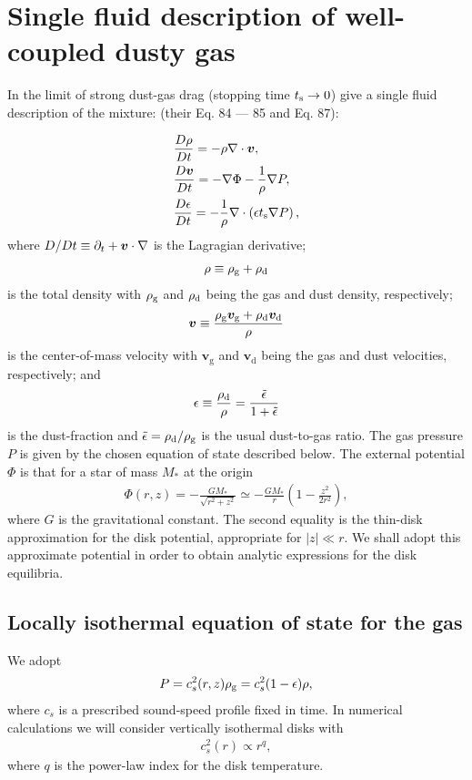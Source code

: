 \section{Single fluid description of well-coupled dusty gas}\label{setup} 
In the limit of strong dust-gas drag (stopping time $t_\mathrm{s}\to 0$) 
\cite{laibe14} give a single fluid description of the mixture:  
(their Eq. 84 --- 85 and Eq. 87): 

\begin{align}
  &\frac{D\rho}{Dt} = -\rho\nabla\cdot\bm{v}, \label{masseq}\\ 
  &\frac{D\bm{v}}{Dt} = - \nabla\Phi - \frac{1}{\rho}\nabla
  P, \label{momeq}\\ 
  &\frac{D\epsilon}{Dt} = -\frac{1}{\rho} \nabla \cdot \left(\epsilon 
  t_\mathrm{s} \nabla P \right),\label{dusteq}  
\end{align}
where $D/Dt \equiv \partial_t + \bm{v}\cdot\nabla$ is the Lagragian
derivative; 
\begin{align}
  \rho \equiv \rho_\mathrm{g} + \rho_\mathrm{d}
\end{align}
is the total density with $\rho_\mathrm{g}$ and $\rho_\mathrm{d}$ being the gas and dust
density, respectively; 
\begin{align}
  \bm{v} \equiv \frac{\rho_\mathrm{g}\bm{v}_\mathrm{g} + 
    \rho_\mathrm{d}\bm{v}_\mathrm{d}}{\rho}
\end{align}
is the center-of-mass velocity with $\bm{v}_\mathrm{g}$ and
$\bm{v}_\mathrm{d}$ being the gas and dust velocities, respectively; 
and 
\begin{align}
  \epsilon \equiv \frac{\rho_\mathrm{d}}{\rho}  = \frac{\tilde{\epsilon}}{1+\tilde{\epsilon}} 
\end{align}
is the dust-fraction and $\tilde{\epsilon}=\rho_\mathrm{d}/\rho_\mathrm{g}$ is the usual
dust-to-gas ratio. The gas pressure $P$ is given by the chosen 
equation of state described below. The external potential $\Phi$ is
that for a star of mass $M_*$ at the origin 
\begin{align}\label{thin_disk_potential}
  \Phi(r,z) =-\frac{GM_*}{\sqrt{r^2 + z^2}}\simeq
  -\frac{GM_*}{r}\left(1 - \frac{z^2}{2r^2}\right), 
\end{align}
where $G$ is the gravitational constant. The second equality is the 
thin-disk approximation for the disk potential, appropriate for
$|z|\ll r$. We shall adopt this approximate potential in order to
obtain analytic expressions for the disk equilibria.  


\subsection{Locally isothermal equation of state for the gas} 
We adopt 
\begin{align}\label{eos}
  P = c_s^2(r,z)\rho_\mathrm{g} = c_s^{2}(1 - \epsilon)\rho,   
\end{align}
where $c_s$ is a prescribed sound-speed profile fixed in time.  
In numerical calculations we will consider vertically  
isothermal disks with 
\begin{align}\label{power_temp}
  c_s^2(r) \propto r^{q},
\end{align}
where $q$ is the power-law index for the disk temperature. 

